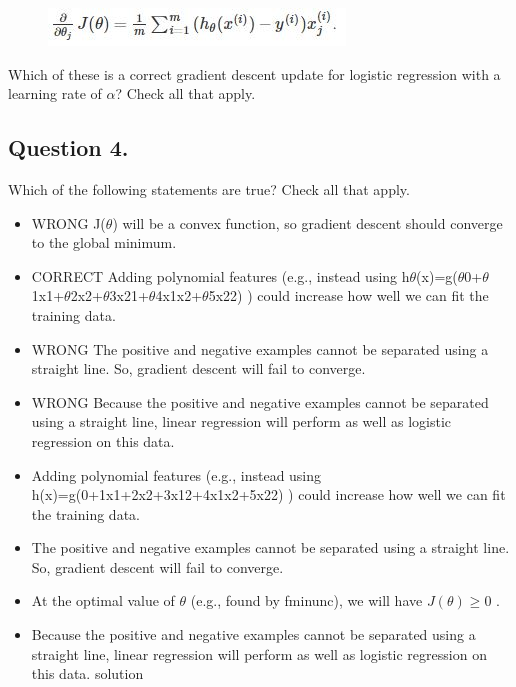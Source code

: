 	\begin{figure}[h!]
\centering
\includegraphics[width=0.5\linewidth]{Week3-Quiz-2}

\end{figure}

	Which of these is a correct gradient descent update for logistic regression with a learning rate of $\alpha$? Check all that apply.

	\subsection*{Question 4. }
	Which of the following statements are true? Check all that apply.
	
	\begin{itemize}
\item WRONG J($\theta$) will be a convex function, so gradient descent should converge to the global minimum.

\item CORRECT Adding polynomial features (e.g., instead using h$\theta$(x)=g($\theta$0+$\theta$1x1+$\theta$2x2+$\theta$3x21+$\theta$4x1x2+$\theta$5x22) ) could increase how well we can fit the training data.

\item WRONG The positive and negative examples cannot be separated using a straight line. So, gradient descent will fail to converge.

\item WRONG Because the positive and negative examples cannot be separated using a straight line, linear regression will perform as well as logistic regression on this data.
	\end{itemize}




\begin{itemize}
	\item Adding polynomial features (e.g., instead using h(x)=g(0+1x1+2x2+3x12+4x1x2+5x22) ) could increase how well we can fit the training data.  
	\item The positive and negative examples cannot be separated using a straight line. So, gradient descent will fail to converge.
	
	\item At the optimal value of $\theta$ (e.g., found by fminunc), we will have $ J(\theta) \geq $0 . 
	\item Because the positive and negative examples cannot be separated using a straight line, linear regression will perform as well as logistic regression on this data.
	solution
\end{itemize}

